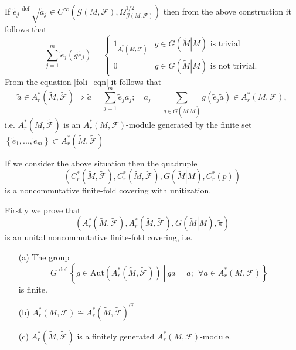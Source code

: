 \documentclass{beamer}
\theoremstyle{plain}
\newcommand{\be}{\begin{equation}}
\newcommand{\ee}{\end{equation}}
\newcommand{\Aut}{\mathrm{Aut}}
\newcommand{\sF}{\mathcal{F}}       %
\newcommand{\bydef}{\stackrel{\mathrm{def}}{=}}
\begin{document}
\begin{frame}
	If $\widetilde e_j \bydef \sqrt{\widetilde a_j}\in C^{\infty} \left(\mathcal G\left( M, \sF\right) , \Omega_{\mathcal G\left( M, \sF\right)}^{1/2}\right)$ then from the above construction it follows that
	\be\label{foli_eqn}
	\sum_{j = 1}^m \widetilde e_j (g \widetilde e_j)= \begin{cases}
		1_{A^*_r \left(\widetilde M, \widetilde{\sF}\right)} &  g\in G\left(\left.\widetilde M\right| M\right)\text{ is trivial}\\
		0 &  g\in G\left(\left.\widetilde M\right| M\right)\text{ is not  trivial}.
	\end{cases}
	\ee
	From the equation \eqref{foli_eqn} it follows that
	$$
	\widetilde a \in A^*_r \left(\widetilde M, \widetilde{\sF}\right)\Rightarrow \widetilde a = \sum_{j=1}^m \widetilde e_j a_j; \quad a_j= \sum_{g \in G\left(\left.\widetilde M\right| M\right)} g\left(  \widetilde e_j  \widetilde a\right)\in A^*_r \left( M, {\sF}\right), 
	$$
	i.e. $A^*_r \left(\widetilde M, \widetilde{\sF}\right)$ is an $A^*_r \left( M, {\sF}\right)$-module generated by the finite set $\left\{\widetilde e_1, ..., \widetilde e_m\right\}\subset A^*_r \left(\widetilde M, \widetilde{\sF}\right)$
\end{frame}
\begin{frame}
	\begin{theorem}
		If we consider the above situation then the quadruple
		$$
		\left(C^*_r \left(\widetilde M, \widetilde{\sF}\right), C^*_r \left(\widetilde M, \widetilde{\sF}\right), G\left(\left.\widetilde M\right| M\right), C^*_r\left(p \right) \right)
		$$
		is a noncommutative finite-fold covering with unitization.
	\end{theorem}
	Firstly we prove that
	$$
	\left(A^*_r \left(\widetilde M, \widetilde{\sF}\right), A^*_r \left(\widetilde M, \widetilde{\sF}\right), G\left(\left.\widetilde M\right| M\right), \widetilde\pi \right)
	$$
	is an unital noncommutative finite-fold covering, i.e.
	\begin{enumerate}
		\item[(a)] The group  
		$$
		G \bydef \left\{ \left.g \in \Aut\left(A^*_r \left(\widetilde M, \widetilde{\sF}\right) \right)~\right|~ ga = a;~~\forall a \in A^*_r \left( M, {\sF}\right)\right\}
		$$
		is finite.
		\item[(b)] 	$
		A^*_r\left( M, {\sF}\right) \cong A^*_r \left(\widetilde M, \widetilde{\sF}\right)^G$
		\item[(c)] $A^*_r \left(\widetilde M, \widetilde{\sF}\right)$ is a finitely generated $A^*_r \left( M, {\sF}\right)$-module.
	\end{enumerate}
\end{frame}
\end{document}
